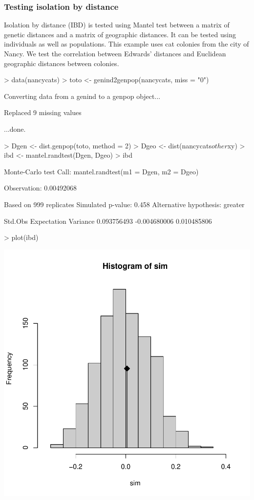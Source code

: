 \documentclass{article}
\begin{document}
\subsubsection{Testing isolation by distance}
Isolation by distance (IBD) is tested using Mantel test between a matrix of genetic distances and a matrix of geographic distances.
It can be tested using individuals as well as populations.
This example uses cat colonies from the city of Nancy.
We test the correlation between Edwards' distances and Euclidean geographic distances between colonies.
\begin{Schunk}
\begin{Sinput}
> data(nancycats)
> toto <- genind2genpop(nancycats, miss = "0")
\end{Sinput}
\begin{Soutput}
 Converting data from a genind to a genpop object... 

 Replaced 9 missing values 

...done.
\end{Soutput}
\begin{Sinput}
> Dgen <- dist.genpop(toto, method = 2)
> Dgeo <- dist(nancycats$other$xy)
> ibd <- mantel.randtest(Dgen, Dgeo)
> ibd
\end{Sinput}
\begin{Soutput}
Monte-Carlo test
Call: mantel.randtest(m1 = Dgen, m2 = Dgeo)

Observation: 0.00492068 

Based on 999 replicates
Simulated p-value: 0.458 
Alternative hypothesis: greater 

     Std.Obs  Expectation     Variance 
 0.093756493 -0.004680006  0.010485806 
\end{Soutput}
\end{Schunk}
\begin{Schunk}
\begin{Sinput}
> plot(ibd)
\end{Sinput}
\end{Schunk}
\includegraphics{figs/base-080}
\end{document}
